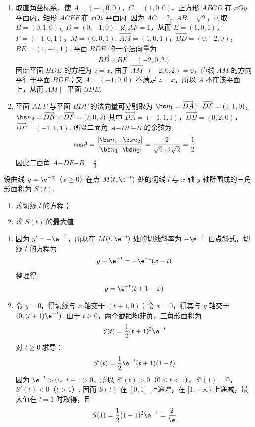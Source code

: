 \begin{solution}
\begin{enumerate}
\item 取直角坐标系，使 \(A=(-1,0,0)\)，\(C=(1,0,0)\)，正方形 \(ABCD\) 在 \(xOy\) 平面内，矩形 \(ACEF\) 在 \(xOz\) 平面内. 因为 \(AC=2\)，\(AB=\sqrt2\)，可取
\(B=(0,1,0)\)，\(D=(0,-1,0)\).
又 \(AF=1\)，从而
\(E=(1,0,1)\)，\(F=(-1,0,1)\)，\(M=(0,0,1)\).
\(\overrightarrow{AM}=(1,0,1)\)，\(\overrightarrow{BD}=(0,-2,0)\)，\(\overrightarrow{BE}=(1,-1,1)\).
平面 \(BDE\) 的一个法向量为
\[
\overrightarrow{BD}\times\overrightarrow{BE}=(-2,0,2)
\]
因此平面 \(BDE\) 的方程为 \(z=x\). 由于 \(\overrightarrow{AM}\cdot(-2,0,2)=0\)，直线 \(AM\) 的方向平行于平面 \(BDE\)；又 \(A=(-1,0,0)\) 不满足 \(z=x\)，所以 \(A\) 不在该平面上，从而 \(AM\parallel\) 平面 \(BDE\).
\item 平面 \(ADF\) 与平面 \(BDF\) 的法向量可分别取为
\(\bs n_1=\overrightarrow{DA}\times\overrightarrow{DF}=(1,1,0)\)，\(\bs n_2=\overrightarrow{DB}\times\overrightarrow{DF}=(2,0,2)\)
其中 \(\overrightarrow{DA}=(-1,1,0)\)，\(\overrightarrow{DB}=(0,2,0)\)，\(\overrightarrow{DF}=(-1,1,1)\). 所以二面角 \(A\mathord{-}DF\mathord{-}B\) 的余弦为
\[
\cos\theta=\frac{|\bs n_1\cdot\bs n_2|}{|\bs n_1||\bs n_2|}
=\frac{2}{\sqrt2\cdot2\sqrt2}=\frac12
\]
因此二面角 \(A\mathord{-}DF\mathord{-}B=\frac{\pi}{3}\).
\end{enumerate}
\end{solution}

\begin{problem}
设曲线 \(y=\e^{-x}\)（\(x\geqslant0\)）在点 \(M(t,\e^{-t})\) 处的切线 \(l\) 与 \(x\) 轴 \(y\) 轴所围成的三角形面积为 \(S(t)\).
\begin{enumerate}
\item 求切线 \(l\) 的方程；
\item 求 \(S(t)\) 的最大值.
\end{enumerate}
\end{problem}

\begin{solution}
\begin{enumerate}
\item 因为 \(y'=-\e^{-x}\)，所以在 \(M(t,\e^{-t})\) 处的切线斜率为 \(-\e^{-t}\). 由点斜式，切线 \(l\) 的方程为
\[
y-\e^{-t}=-\e^{-t}(x-t)
\]
整理得
\[
y=\e^{-t}(t+1-x)
\]
\item 令 \(y=0\)，得切线与 \(x\) 轴交于 \((t+1,0)\)；令 \(x=0\)，得其与 \(y\) 轴交于 \((0,(t+1)\e^{-t})\). 由于 \(t\geqslant0\)，两个截距均非负，三角形面积为
\[
S(t)=\frac12(t+1)^2\e^{-t}
\]
对 \(t\geqslant0\) 求导：
\[
S'(t)=\frac12\e^{-t}(t+1)(1-t)
\]
因为 \(\e^{-t}>0\)，\(t+1>0\)，所以 \(S'(t)>0\)（\(0\leqslant t<1\)），\(S'(1)=0\)，\(S'(t)<0\)（\(t>1\)）. 因而 \(S(t)\) 在 \([0,1]\) 上递增，在 \([1,+\infty)\) 上递减，最大值在 \(t=1\) 时取得，且
\[
S(1)=\frac12(1+1)^2\e^{-1}=\frac2{\e}
\]
\end{enumerate}
\end{solution}

